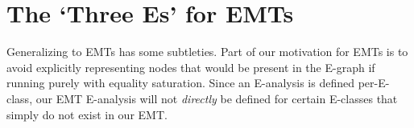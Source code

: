 \documentclass[12pt,a4paper,twoside,openright]{report}
\numberwithin{equation}{chapter}		%
\numberwithin{figure}{chapter}			%
\numberwithin{table}{chapter}			%
\theoremstyle{definition}
\theoremstyle{plain}
\begin{document}







\section{The `Three Es' for EMTs}
Generalizing to EMTs has some subtleties. Part of our motivation for EMTs is to avoid explicitly representing nodes that would be present in the E-graph if running purely with equality saturation. Since an E-analysis is defined per-E-class, our EMT E-analysis will not \emph{directly} be defined for certain E-classes that simply do not exist in our EMT.
\end{document}
